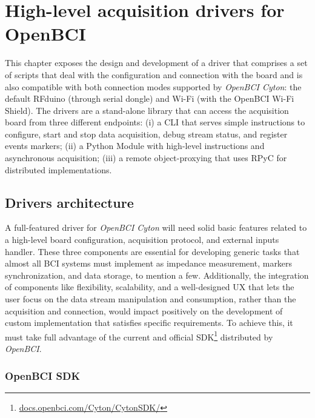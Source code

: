 \chapter{High-level acquisition drivers for OpenBCI}\label{ch:chapter_2}

This chapter exposes the design and development of a driver that comprises a set of scripts that deal with the configuration and connection with the board and is also compatible with both connection modes supported by \textit{OpenBCI Cyton}: the default RFduino (through serial dongle) and Wi-Fi (with the OpenBCI Wi-Fi Shield). The drivers are a stand-alone library that can access the acquisition board from three different endpoints: 
(i) a \gls*{CLI} that serves simple instructions to configure, start and stop data acquisition, debug stream status, and register events markers; 
(ii) a Python Module with high-level instructions and asynchronous acquisition; 
(iii) a remote object-proxying that uses \Gls*{RPyC} for distributed implementations.

\section{Drivers architecture}

A full-featured driver for \textit{OpenBCI Cyton} will need solid basic features related to a high-level board configuration, acquisition protocol, and external inputs handler. These three components are essential for developing generic tasks that almost all BCI systems must implement as impedance measurement, markers synchronization, and data storage, to mention a few. Additionally, the integration of components like flexibility, scalability, and a well-designed \gls*{UX} that lets the user focus on the data stream manipulation and consumption, rather than the acquisition and connection, would impact positively on the development of custom implementation that satisfies specific requirements. To achieve this, it must take full advantage of the current and official SDK\footnote{\href{https://docs.openbci.com/Cyton/CytonSDK/}{docs.openbci.com/Cyton/CytonSDK/}} distributed by \textit{OpenBCI}.



\subsection{OpenBCI SDK}


